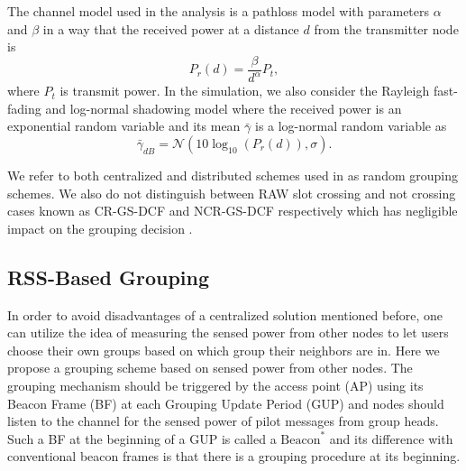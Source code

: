 The channel model used in the analysis is a pathloss model with parameters $\alpha$ and $\beta$ in a way that the received power at a distance $d$ from the transmitter node is
\begin{equation}
P_r(d)=\frac{\beta}{d^\alpha} P_t,
\end{equation}
where $P_t$ is transmit power. In the simulation, we also consider the Rayleigh fast-fading and log-normal shadowing model where the received power is an exponential random variable and its mean $\bar{\gamma}$ is a log-normal random variable as 
\begin{equation}
\bar{\gamma}_{dB}= \mathcal{N}(10\log_{10}(P_r(d)),\sigma).
\end{equation}

We refer to both centralized and distributed schemes used in \cite{zheng2014performance} as random grouping schemes. We also do not distinguish between RAW slot crossing and not crossing cases known as CR-GS-DCF and NCR-GS-DCF respectively which has negligible impact on the grouping decision \cite{Draft80211ah}. 

\subsection{RSS-Based Grouping}
\label{rssbasedmain}
In order to avoid disadvantages of a centralized solution mentioned before, one can utilize the idea of measuring the sensed power from other nodes to let users choose their own groups based on which group their neighbors are in. Here we propose a grouping scheme based on sensed power from other nodes. %
The grouping mechanism should be triggered by the access point (AP) using its Beacon Frame (BF) at each Grouping Update Period (GUP) and nodes should listen to the channel for the sensed power of pilot messages from group heads. Such a BF at the beginning of a GUP is called a $\text{Beacon}^\ast$ and its difference with conventional beacon frames is that there is a grouping procedure at its beginning. 




